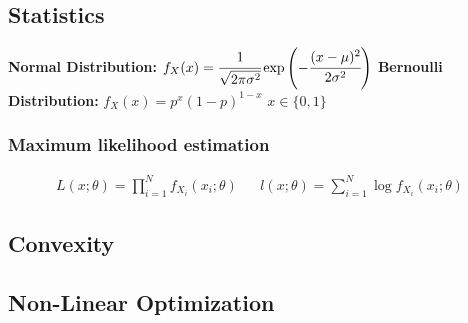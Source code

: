 \begin{mdframed}[style=eqbox]
\subsection{Statistics}
\textbf{Normal Distribution:}
\(f_X(x) = \cfrac{1}{\sqrt{2\pi \sigma^2}} \exp\left(-\cfrac{(x-\mu)^2}{2\sigma^2}\right)\)
\textbf{Bernoulli Distribution:} \(f_X(x) = p^x (1 - p)^{1-x}\) \(x \in \{0, 1\}\)
\subsubsection*{Maximum likelihood estimation}
\vspace*{-10pt}\begin{align*}
  L(x;\theta) = \prod_{i=1}^N f_{X_i}(x_i; \theta) && l(x;\theta) = \sum_{i=1}^N \log f_{X_i}(x_i; \theta)
\end{align*}
\end{mdframed}
%
\begin{mdframed}[style=eqbox]
\subsection{Convexity}
\end{mdframed}
%
\begin{mdframed}[style=eqbox]
\subsection{Non-Linear Optimization}
\end{mdframed}